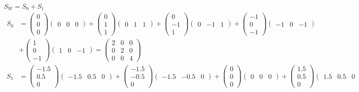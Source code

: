 $S_W = S_0 + S_1$
\begin{align*}
  S_0 &= \begin{pmatrix} 0\\ 0\\ 0\end{pmatrix} \begin{pmatrix} 0& 0& 0\end{pmatrix} + \begin{pmatrix} 0\\ 1\\ 1\end{pmatrix} \begin{pmatrix} 0& 1& 1\end{pmatrix} + \begin{pmatrix} 0\\ -1\\ 1\end{pmatrix} \begin{pmatrix} 0& -1& 1\end{pmatrix} + \begin{pmatrix} -1\\ 0\\ -1\end{pmatrix} \begin{pmatrix} -1& 0& -1\end{pmatrix} \\
  &+ \begin{pmatrix} 1\\ 0\\ -1\end{pmatrix} \begin{pmatrix} 1& 0& -1\end{pmatrix} = \begin{pmatrix} 2&0&0\\ 0&2&0\\ 0&0&4\end{pmatrix} \\
  S_1 &= \begin{pmatrix} -1.5\\ 0.5\\ 0\end{pmatrix} \begin{pmatrix} -1.5& 0.5& 0\end{pmatrix} + \begin{pmatrix} -1.5\\ -0.5\\ 0\end{pmatrix} \begin{pmatrix} -1.5& -0.5& 0\end{pmatrix} + \begin{pmatrix} 0\\ 0\\ 0\end{pmatrix} \begin{pmatrix} 0& 0& 0\end{pmatrix} + \begin{pmatrix} 1.5\\ 0.5\\ 0\end{pmatrix} \begin{pmatrix} 1.5& 0.5& 0\end{pmatrix} \\

\end{align*}
